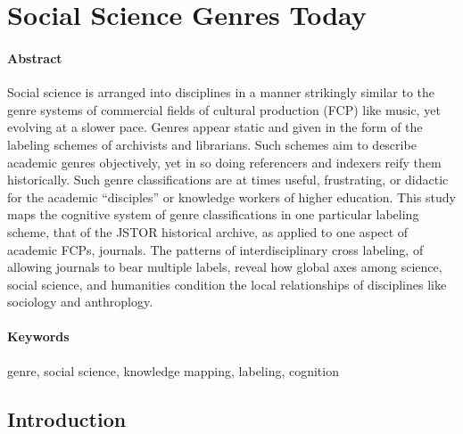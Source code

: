 \documentclass[]{book}
\theoremstyle{definition}
\theoremstyle{definition}
\theoremstyle{definition}
\theoremstyle{remark}
\begin{document}
\hypertarget{gen}{%
\chapter{Social Science Genres Today}\label{gen}}

\hypertarget{abstract-1}{%
\subsubsection*{Abstract}\label{abstract-1}}


Social science is arranged into disciplines in a manner
strikingly similar to the genre systems of commercial fields of cultural
production (FCP) like music, yet evolving at a slower pace. Genres
appear static and given in the form of the labeling schemes of
archivists and librarians. Such schemes aim to describe academic genres
objectively, yet in so doing referencers and indexers reify them
historically. Such genre classifications are at times useful,
frustrating, or didactic for the academic ``disciples'' or knowledge
workers of higher education. This study maps the cognitive system of
genre classifications in one particular labeling scheme, that of the
JSTOR historical archive, as applied to one aspect of academic FCPs,
journals. The patterns of interdisciplinary cross labeling, of allowing
journals to bear multiple labels, reveal how global axes among science,
social science, and humanities condition the local relationships of
disciplines like sociology and anthroplogy.

\hypertarget{keywords-1}{%
\subsubsection*{Keywords}\label{keywords-1}}


genre, social science, knowledge mapping, labeling,
cognition

\hypertarget{introduction}{%
\section{Introduction}\label{introduction}}
\end{document}

